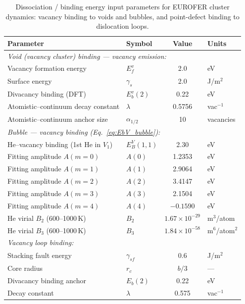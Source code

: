\documentclass[pdflatex,sn-basic]{sn-jnl} %
\begin{document}
\begin{table}[htbp]
\centering
\caption{Dissociation / binding energy input parameters for EUROFER cluster
dynamics: vacancy binding to voids and bubbles, and point-defect binding to
dislocation loops.}
\label{tab:dissoc_params}
\renewcommand{\arraystretch}{1.15}
\begin{tabular}{@{}llcl@{}}
\toprule
\textbf{Parameter} & \textbf{Symbol} & \textbf{Value} & \textbf{Units} \\
\midrule
\multicolumn{4}{l}{\emph{Void (vacancy cluster) binding --- vacancy emission:}} \\
Vacancy formation energy & $E_f^v$ & 2.0 & eV \\
Surface energy & $\gamma_s$ & 2.0 & J/m$^2$ \\
Divacancy binding (DFT) & $E_b^v(2)$ & 0.22 & eV \\
Atomistic--continuum decay constant & $\lambda$ & 0.5756 & vac$^{-1}$ \\
Atomistic--continuum anchor size & $\alpha_{1/2}$ & 10 & vacancies \\[4pt]

\multicolumn{4}{l}{\emph{Bubble --- vacancy binding (Eq.~\ref{eq:EbV_bubble}):}} \\
He--vacancy binding (1st He in $V_1$) & $E_B^V(1,1)$ & 2.30 & eV \\
Fitting amplitude $A(m=0)$ & $A(0)$ & 1.2353 & eV \\
Fitting amplitude $A(m=1)$ & $A(1)$ & 2.9064 & eV \\
Fitting amplitude $A(m=2)$ & $A(2)$ & 3.4147 & eV \\
Fitting amplitude $A(m=3)$ & $A(3)$ & 2.1504 & eV \\
Fitting amplitude $A(m=4)$ & $A(4)$ & $-0.1590$ & eV \\
He virial $B_2$ (600--1000\,K) & $B_2$ & $1.67\times10^{-29}$ & m$^3$/atom \\
He virial $B_3$ (600--1000\,K) & $B_3$ & $1.84\times10^{-58}$ & m$^6$/atom$^2$ \\[4pt]

\multicolumn{4}{l}{\emph{Vacancy loop binding:}} \\
Stacking fault energy & $\gamma_{sf}$ & 0.6 & J/m$^2$ \\
Core radius & $r_c$ & $b/3$ & --- \\
Divacancy binding anchor & $E_b(2)$ & 0.22 & eV \\
Decay constant & $\lambda$ & 0.575 & vac$^{-1}$ \\[4pt]


\end{tabular}
\end{table}
\end{document}
